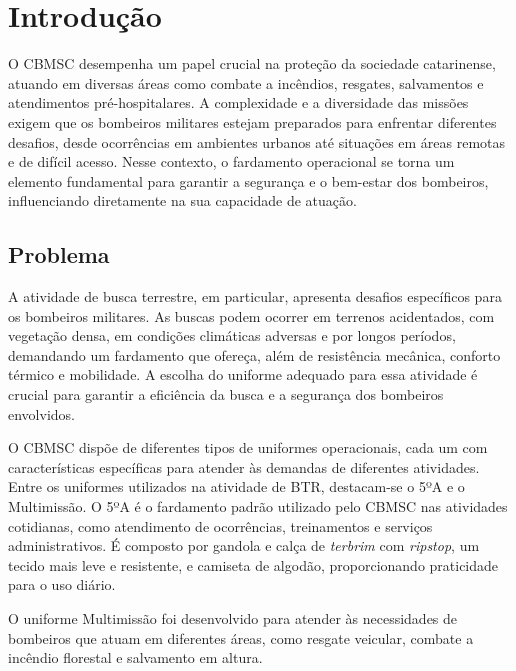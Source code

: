 \chapter{Introdução}



	O \acrfull{CBMSC} desempenha um papel crucial na proteção da sociedade catarinense, atuando em 
	diversas áreas como combate a incêndios, resgates, salvamentos e atendimentos pré-hospitalares. 
	A complexidade e a diversidade das missões exigem que os bombeiros militares estejam preparados 
	para enfrentar diferentes desafios, desde ocorrências em ambientes urbanos até situações em 
	áreas remotas e de difícil acesso.  Nesse contexto, o fardamento operacional se torna um 
	elemento fundamental para garantir a segurança e o bem-estar dos bombeiros, influenciando 
	diretamente na sua capacidade de atuação.

	\section{Problema}

		A atividade de busca terrestre, em particular, apresenta desafios específicos para os bombeiros militares.
		As buscas podem ocorrer em terrenos acidentados, com vegetação densa, em condições climáticas adversas e por longos períodos,
		demandando um fardamento que ofereça, além de resistência mecânica, conforto térmico e mobilidade.  
		A escolha do uniforme adequado para essa atividade é crucial para garantir a eficiência da busca e a segurança dos bombeiros envolvidos.

		O \acrshort{CBMSC} dispõe de diferentes tipos de uniformes operacionais, cada um com características específicas para atender
		às demandas de diferentes atividades.  Entre os uniformes utilizados na atividade de \acrfull{BTR}, destacam-se o 5ºA e o Multimissão.
		O 5ºA é o fardamento padrão utilizado pelo \acrshort{CBMSC} nas atividades cotidianas, como atendimento de ocorrências,
		treinamentos e serviços administrativos. É composto por gandola e calça de \textit{terbrim} com \textit{ripstop}, um tecido mais leve e 
		resistente, e camiseta de algodão, proporcionando praticidade para o uso diário.

		O uniforme Multimissão foi desenvolvido para atender às necessidades de bombeiros que atuam em diferentes áreas, como resgate veicular,
	 	combate a incêndio florestal e salvamento em altura.

